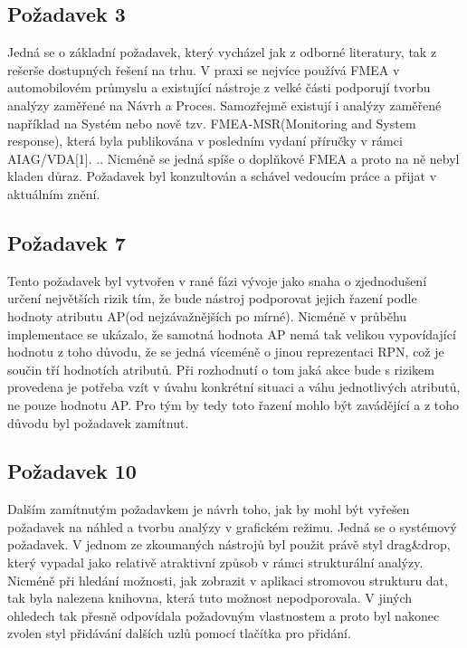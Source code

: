 \subsection{Požadavek 3}
Jedná se o základní požadavek, který vycházel jak z odborné literatury, tak z rešerše dostupných řešení na trhu. V praxi se nejvíce používá FMEA v automobilovém průmyslu a existující nástroje z velké části podporují tvorbu analýzy zaměřené na Návrh a Proces. Samozřejmě existují i analýzy zaměřené například na Systém nebo nově tzv. FMEA-MSR(Monitoring and System response), která byla publikována v posledním vydaní příručky v rámci AIAG/VDA[1]. .. Nicméně se jedná spíše o doplňkové FMEA a proto na ně nebyl kladen důraz. Požadavek byl konzultován a schável vedoucím práce a přijat v aktuálním znění.  

\subsection{Požadavek 7}
Tento požadavek byl vytvořen v rané fázi vývoje jako snaha o zjednodušení určení největších rizik tím, že bude nástroj podporovat jejich řazení podle hodnoty atributu AP(od nejzávažnějších po mírné). Nicméně v průběhu implementace se ukázalo, že samotná hodnota AP nemá tak velikou vypovídající hodnotu z toho důvodu, že se jedná víceméně o jinou reprezentaci RPN, což je součin tří hodnotích atributů. Při rozhodnutí o tom jaká akce bude s rizikem provedena je potřeba vzít v úvahu konkrétní situaci a váhu jednotlivých atributů, ne pouze hodnotu AP. Pro tým by tedy toto řazení mohlo být zavádějící a z toho důvodu byl požadavek zamítnut.   

\subsection{Požadavek 10}
\label{subsec:pozadavek_10}
Dalším zamítnutým požadavkem je návrh toho, jak by mohl být vyřešen požadavek na náhled a tvorbu analýzy v grafickém režimu. Jedná se o systémový požadavek. V jednom ze zkoumaných nástrojů byl použit právě styl drag\&drop, který vypadal jako relativě atraktivní způsob v rámci strukturální analýzy. Nicméně při hledání možnosti, jak zobrazit v aplikaci stromovou strukturu dat, tak byla nalezena knihovna, která tuto možnost nepodporovala. V jiných ohledech tak přesně odpovídala požadovným vlastnostem a proto byl nakonec zvolen styl přidávání dalších uzlů pomocí tlačítka pro přidání. 

